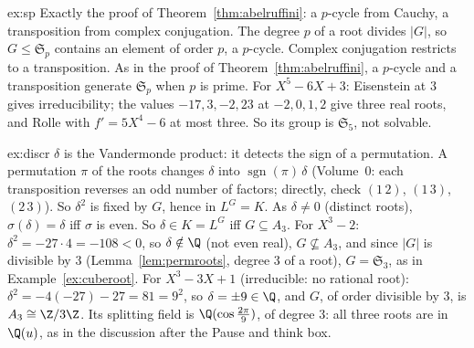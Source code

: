 \begin{solution}{ex:sp}
\idea Exactly the proof of Theorem~\ref{thm:abelruffini}: a $p$-cycle from Cauchy, a transposition from complex conjugation.
\writeup The degree $p$ of a root divides $|G|$, so $G\le\mathfrak S_p$ contains an element of order $p$, a $p$-cycle. Complex conjugation restricts to a transposition. As in the proof of Theorem~\ref{thm:abelruffini}, a $p$-cycle and a transposition generate $\mathfrak S_p$ when $p$ is prime. For $X^5-6X+3$: Eisenstein at $3$ gives irreducibility; the values $-17,3,-2,23$ at $-2,0,1,2$ give three real roots, and Rolle with $f'=5X^4-6$ at most three. So its group is $\mathfrak S_5$, not solvable.
\end{solution}

\begin{solution}{ex:discr}
\idea $\delta$ is the Vandermonde product: it detects the sign of a permutation.
\writeup A permutation $\pi$ of the roots changes $\delta$ into $\operatorname{sgn}(\pi)\,\delta$ (Volume~0: each transposition reverses an odd number of factors; directly, check $(1\,2)$, $(1\,3)$, $(2\,3)$). So $\delta^2$ is fixed by $G$, hence in $L^G=K$. As $\delta\ne0$ (distinct roots), $\sigma(\delta)=\delta$ iff $\sigma$ is even. So $\delta\in K=L^G$ iff $G\subseteq A_3$. For $X^3-2$: $\delta^2=-27\cdot4=-108<0$, so $\delta\notin\Q$ (not even real), $G\not\subseteq A_3$, and since $|G|$ is divisible by $3$ (Lemma~\ref{lem:permroots}, degree $3$ of a root), $G=\mathfrak S_3$, as in Example~\ref{ex:cuberoot}. For $X^3-3X+1$ (irreducible: no rational root): $\delta^2=-4(-27)-27=81=9^2$, so $\delta=\pm9\in\Q$, and $G$, of order divisible by $3$, is $A_3\cong\Z/3\Z$. Its splitting field is $\Q(\cos\frac{2\pi}9)$, of degree $3$: all three roots are in $\Q(u)$, as in the discussion after the Pause and think box.
\end{solution}


